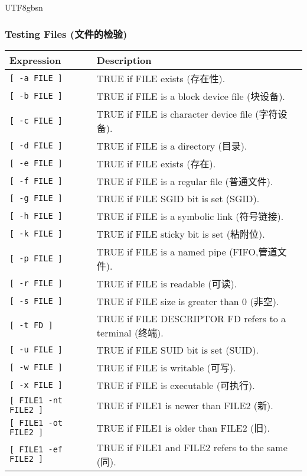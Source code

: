 \documentclass[red]{beamer}
\newcommand*{\lstverb}{\lstinline[style=caret]}
\begin{document}
\begin{CJK*}{UTF8}{gbsn}
\begin{frame}
\frametitle{Testing Files (文件的检验)}
\begin{table}[ht]
\tiny
\renewcommand\arraystretch{1.2}
\begin{tabular}{lll}
\hline
\textbf{Expression} & \textbf{Description}\\
\hline
\lstverb|[ -a FILE ]| & TRUE if FILE exists (存在性).\\
\lstverb|[ -b FILE ]| & TRUE if FILE is a block device file (块设备).\\
\lstverb|[ -c FILE ]| & TRUE if FILE is character device file (字符设备).\\
\lstverb|[ -d FILE ]| & TRUE if FILE is a directory (目录).\\
\lstverb|[ -e FILE ]| & TRUE if FILE exists (存在).\\
\lstverb|[ -f FILE ]| & TRUE if FILE is a regular file (普通文件).\\
\lstverb|[ -g FILE ]| & TRUE if FILE SGID bit is set (SGID).\\
\lstverb|[ -h FILE ]| & TRUE if FILE is a symbolic link (符号链接).\\
\lstverb|[ -k FILE ]| & TRUE if FILE sticky bit is set (粘附位).\\
\lstverb|[ -p FILE ]| & TRUE if FILE is a named pipe (FIFO,管道文件).\\
\lstverb|[ -r FILE ]| & TRUE if FILE is readable (可读).\\
\lstverb|[ -s FILE ]| & TRUE if FILE size is greater than 0 (非空).\\
\lstverb|[ -t FD ]| & TRUE if FILE DESCRIPTOR FD refers to a terminal (终端).\\
\lstverb|[ -u FILE ]| & TRUE if FILE SUID bit is set (SUID).\\
\lstverb|[ -w FILE ]| & TRUE if FILE is writable (可写).\\
\lstverb|[ -x FILE ]| & TRUE if FILE is executable (可执行).\\
\lstverb|[ FILE1 -nt FILE2 ]| & TRUE if FILE1 is newer than FILE2 (新).\\
\lstverb|[ FILE1 -ot FILE2 ]| & TRUE if FILE1 is older than FILE2 (旧).\\
\lstverb|[ FILE1 -ef FILE2 ]| & TRUE if FILE1 and FILE2 refers to the same (同).\\
\hline
\end{tabular}
\end{table}
\end{frame}



\end{CJK*}
\end{document}

